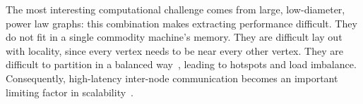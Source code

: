 \documentclass[10pt,nocopyrightspace]{sigplanconf}
\begin{document}






The most interesting computational challenge comes from large,
low-diameter, power law graphs: this combination makes extracting
performance difficult. They do not fit in a single commodity machine's
memory. They are difficult lay out with locality, since every vertex
needs to be near every other vertex. They are difficult to partition
in a balanced way~\cite{lang, leskovec}, leading to hotspots and load
imbalance. Consequently, high-latency inter-node communication becomes
an important limiting factor in scalability~\cite{yoo:parallelbfs}.


\end{document}
